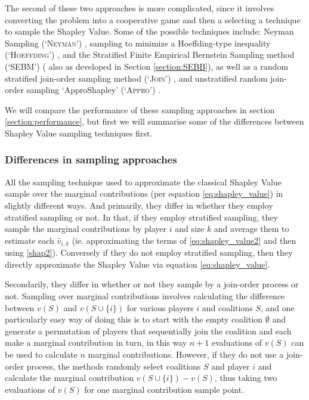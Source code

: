 The second of these two approaches is more complicated, since it involves converting the problem into a cooperative game and then a selecting a technique to sample the Shapley Value.
Some of the possible techniques include: Neyman Sampling (`\textsc{Neyman}') \cite{CASTRO2017180,1938.10503378}, sampling to minimize a Hoeffding-type inequality (`\textsc{Hoeffding}') \cite{2013arXiv1306.4265M}, and the Stratified Finite Empirical Bernstein Sampling method (`SEBM') (\cite{burgess2} also as developed in Section \ref{section:SEBB}), as well as a random stratified join-order sampling method (`\textsc{Join}') \cite{CASTRO2017180}, and unstratified random join-order sampling `ApproShapley' (`\textsc{Appro}') \cite{DBLP:journals/cor/CastroGT09}.

We will compare the performance of these sampling approaches in section \ref{section:performance}, but first we will summarise some of the differences between Shapley Value sampling techniques first.

\subsubsection*{Differences in sampling approaches}

All the sampling technique used to approximate the classical Shapley Value sample over the marginal contributions (per equation \ref{eq:shapley_value}) in slightly different ways.
And primarily, they differ in whether they employ stratified sampling or not.
In that, if they employ stratified sampling, they sample the marginal contributions by player $i$ and size $k$ and average them to estimate each $\hat{v}_{i,k}$ (ie. approximating the terms of \eqref{eq:shapley_value2} and then using \eqref{shap2}).
Conversely if they do not employ stratified sampling, then they directly approximate the Shapley Value via equation \eqref{eq:shapley_value}.

Secondarily, they differ in whether or not they sample by a join-order process or not. Sampling over marginal contributions involves calculating the difference between $v(S)$ and $v(S\cup\{i\})$ for various players $i$ and coalitions $S$, and one particularly easy way of doing this is to start with the empty coalition $\emptyset$ and generate a permutation of players that sequentially join the coalition and each make a marginal contribution in turn, in this way $n+1$ evaluations of $v(S)$ can be used to calculate $n$ marginal contributions.%
However, if they do not use a join-order process, the methods randomly select coalitions $S$ and player $i$ and calculate the marginal contribution $v(S\cup\{i\}) - v(S)$, thus taking two evaluations of $v(S)$ for one marginal contribution sample point.

